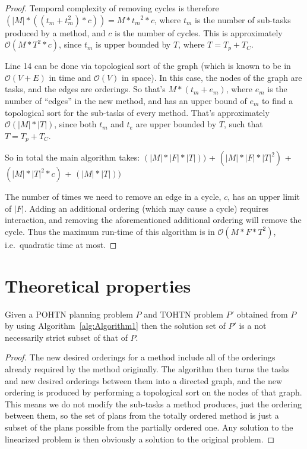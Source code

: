 \begin{proof}
	Temporal complexity of removing cycles is therefore $(|M| * ((t_m + t_m^2) * c)) = M * {t_m}^2 * c$, where $t_m$ is the number of sub-tasks produced by a method, and $c$ is the number of cycles.
	This is approximately $\mathcal{O}(M * T^2 * c)$, since $t_m$ is upper bounded by $T$, where $T=T_p + T_C$.
	
	Line 14 can be done via topological sort of the graph (which is known to be in $\mathcal{O}(V+E)$ in time and $\mathcal{O}(V)$ in space). In this case, the nodes of the graph are tasks, and the edges are orderings. So that's $M * (t_m+e_m)$, where $e_m$ is the number of \enquote{edges} in the new method, and has an upper bound of $e_m$ to find a topological sort for the sub-tasks of every method. That's approximately $\mathcal{O}(|M| * |T|)$, since both $t_m$ and $t_e$ are upper bounded by $T$, such that $T=T_p + T_C$.
	
	So in total the main algorithm takes: \newline
	$(|M| * |F| * |T|))$  +    %
	$(|M| * |F| * |T|^2)$ + %
	$(|M| * |T|^2 * c)$ +   %
	$(|M| * |T|))$        %
	
	
	The number of times we need to remove an edge in a cycle, $c$, has an upper limit of $|F|$.
	Adding an additional ordering (which may cause a cycle) requires interaction, and removing the aforementioned additional ordering will remove the cycle. Thus the maximum run-time of this algorithm is in $\mathcal{O}(M * F * T^2)$, i.e.\ quadratic time at most.
\end{proof}



\section{Theoretical properties}
\begin{theorem}\label{thm:Soundness}
	Given a POHTN planning problem $P$ and TOHTN problem
	$P'$ obtained from $P$ by using Algorithm~\ref{alg:Algorithm1}
	then the solution set of $P'$ is a not necessarily strict subset of that of $P$.
\end{theorem}
\begin{proof}
	The new desired orderings for a method include all of the orderings already required by the method originally. The algorithm then turns the tasks and new desired orderings between them into a directed graph, and the new ordering is produced by performing a topological sort on the nodes of that graph. This means we do not modify the sub-tasks a method produces, just the ordering between them, so the set of plans from the totally ordered method is just a subset of the plans possible from the partially ordered one. Any solution to the linearized problem is then obviously a solution to the original problem.
\end{proof}


